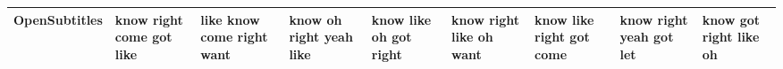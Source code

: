 \documentclass[11pt,a4paper]{article}
\begin{document}
\begin{appendices}
\begin{table*}[htp]
\begin{tiny}
\begin{tabular}{|p{}|p{}|p{}|p{}|p{}|p{}|p{}|p{}|p{}|}
OpenSubtitles & know \newline right \newline come \newline got \newline like & like \newline know \newline come \newline right \newline want & know \newline oh \newline right \newline yeah \newline like & know \newline like \newline oh \newline got \newline right & know \newline right \newline like \newline oh \newline want & know \newline like \newline right \newline got \newline come & know \newline right \newline yeah \newline got \newline let & know \newline got \newline right \newline like \newline oh\\\hline

\end{tabular}
\end{tiny}
\end{table*}
\end{appendices}
\end{document}
